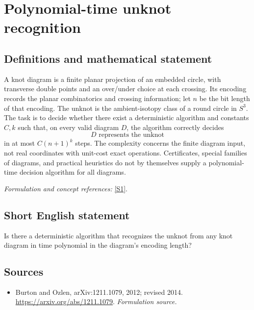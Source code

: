 \documentclass[11pt]{article}
\begin{document}
\section*{\texorpdfstring{Polynomial-time unknot recognition}{Polynomial-time unknot recognition}}\label{317}
\subsection{Definitions and mathematical statement}
A knot diagram is a finite planar projection of an embedded circle, with transverse double points and an over/under choice at each crossing. Its encoding records the planar combinatorics and crossing information; let $n$ be the bit length of that encoding. The unknot is the ambient-isotopy class of a round circle in $S^3$. The task is to decide whether there exist a deterministic algorithm and constants $C,k$ such that, on every valid diagram $D$, the algorithm correctly decides
\[
 D\text{ represents the unknot}
\]
in at most $C(n+1)^k$ steps. The complexity concerns the finite diagram input, not real coordinates with unit-cost exact operations. Certificates, special families of diagrams, and practical heuristics do not by themselves supply a polynomial-time decision algorithm for all diagrams.
\par\smallskip\textit{Formulation and concept references:} \href{https://arxiv.org/abs/1211.1079}{[S1]}.

\subsection{Short English statement}
Is there a deterministic algorithm that recognizes the unknot from any knot diagram in time polynomial in the diagram's encoding length?
\subsection{Sources}
\begin{itemize}
\item[S1]Burton and Ozlen, arXiv:1211.1079, 2012; revised 2014.
\url{https://arxiv.org/abs/1211.1079}.
\textit{Formulation source.}
\end{itemize}
\end{document}
